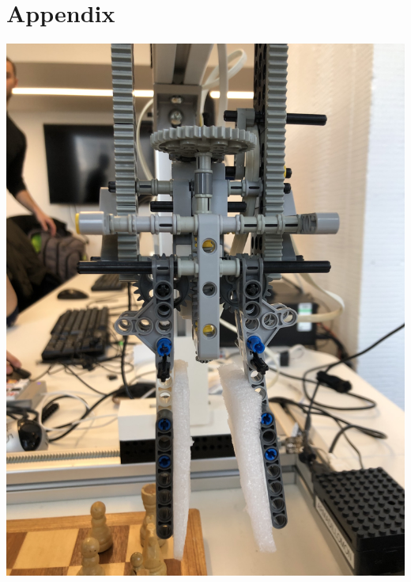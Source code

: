 \documentclass[onecolumn]{IEEEtran}
\begin{document}
\section{Appendix}
\smallskip

\begin{center}
\begin{minipage}[c]{.45\textwidth}
  \includegraphics[scale = .05]{gripper}
   \label{fig:gripper}
\end{minipage}
\begin{minipage}[c]{.45\textwidth}

\end{minipage}
\end{center}
\end{document}
